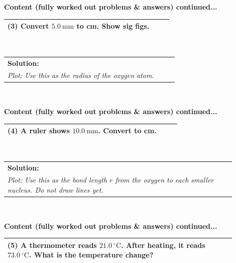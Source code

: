 \documentclass{article}
\begin{document}
{{{
\newpage
\noindent
{\large \textbf{Content (fully worked out problems \& answers) continued...}
\\
\begin{tabular}{|p{0.9\linewidth}|}
\hline
\textbf{(3)} Convert $5.0~\text{mm}$ to cm. Show sig figs.
\\ \hline
\end{tabular}
\\
\begin{tabular}{|p{0.9\linewidth}|}
\hline
\textbf{Solution:} \\
\textit{Plot: Use this as the radius of the oxygen atom.} \\
\hline
\end{tabular}
\\
\newpage
\noindent
{\large \textbf{Content (fully worked out problems \& answers) continued...}
\\
\begin{tabular}{|p{0.9\linewidth}|}
\hline
\textbf{(4)} A ruler shows $10.0~\text{mm}$. Convert to cm.
\\ \hline
\end{tabular}
\\
\begin{tabular}{|p{0.9\linewidth}|}
\hline
\textbf{Solution:} \\
\textit{Plot: Use this as the bond length $r$ from the oxygen to each smaller nucleus. Do not draw lines yet.} \\
\hline
\end{tabular}
\\
\newpage
\noindent
{\large \textbf{Content (fully worked out problems \& answers) continued...}
\\
\begin{tabular}{|p{0.9\linewidth}|}
\hline
\textbf{(5)} A thermometer reads $21.0~^\circ\text{C}$. After heating, it reads $73.0~^\circ\text{C}$.  
What is the temperature change? 
\\ \hline
\end{tabular}
\\
\begin{tabular}{|p{0.9\linewidth}|}

\end{tabular}}}}}}}
\end{document}

